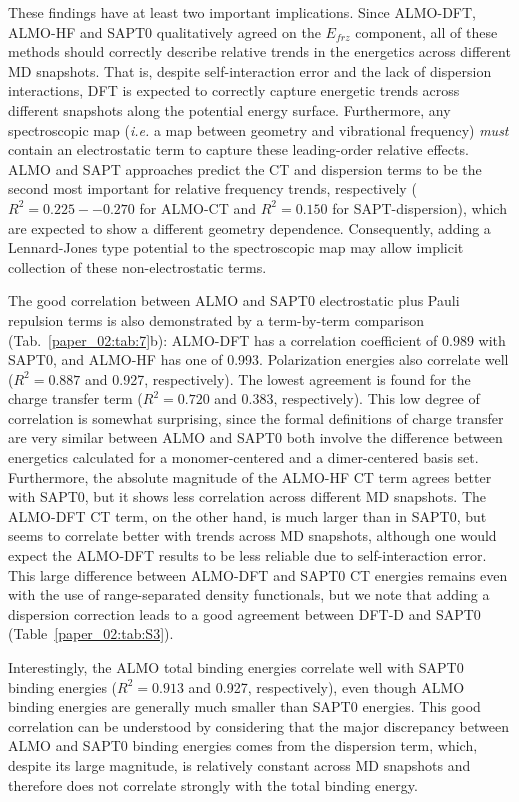 These findings have at least two important implications. Since ALMO-DFT, ALMO-HF and SAPT0 qualitatively agreed on the \(E_{frz}\) component, all of these methods should correctly describe relative trends in the energetics across different MD snapshots. That is, despite self-interaction error and the lack of dispersion interactions, DFT is expected to correctly capture energetic trends across different snapshots along the potential energy surface. Furthermore, any spectroscopic map (\emph{i.e.} a map between  geometry and vibrational frequency) \emph{must} contain an electrostatic term to capture these leading-order relative effects. ALMO and SAPT approaches predict the CT and dispersion terms to be the second most important for relative frequency trends, respectively (\(R^2 = 0.225 -- 0.270\) for ALMO-CT and \(R^2 = 0.150\) for SAPT-dispersion), which are expected to show a different geometry dependence. Consequently, adding a Lennard-Jones type potential to the spectroscopic map may allow implicit collection of these non-electrostatic terms.

The good correlation between ALMO and SAPT0 electrostatic plus Pauli repulsion terms is also demonstrated by a term-by-term comparison (Tab.~\ref{paper_02:tab:7}b): ALMO-DFT has a correlation coefficient of \num{0.989} with SAPT0, and ALMO-HF has one of \num{0.993}. Polarization energies also correlate well (\(R^2 = 0.887\) and \num{0.927}, respectively). The lowest agreement is found for the charge transfer term (\(R^2 = 0.720\) and \num{0.383}, respectively). This low degree of correlation is somewhat surprising, since the formal definitions of charge transfer are very similar between ALMO and SAPT0 \textemdash{} both involve the difference between energetics calculated for a monomer-centered and a dimer-centered basis set. Furthermore, the absolute magnitude of the ALMO-HF CT term agrees better with SAPT0, but it shows less correlation across different MD snapshots. The ALMO-DFT CT term, on the other hand, is much larger than in SAPT0, but seems to correlate better with trends across MD snapshots, although one would expect the ALMO-DFT results to be less reliable due to self-interaction error. This large difference between ALMO-DFT and SAPT0 CT energies remains even with the use of range-separated density functionals, but we note that adding a dispersion correction leads to a good agreement between DFT-D and SAPT0 (Table~\ref{paper_02:tab:S3}).

Interestingly, the ALMO total binding energies correlate well with SAPT0 binding energies (\(R^2 = 0.913\) and \num{0.927}, respectively), even though ALMO binding energies are generally much smaller than SAPT0 energies. This good correlation can be understood by considering that the major discrepancy between ALMO and SAPT0 binding energies comes from the dispersion term, which, despite its large magnitude, is relatively constant across MD snapshots and therefore does not correlate strongly with the total binding energy.

